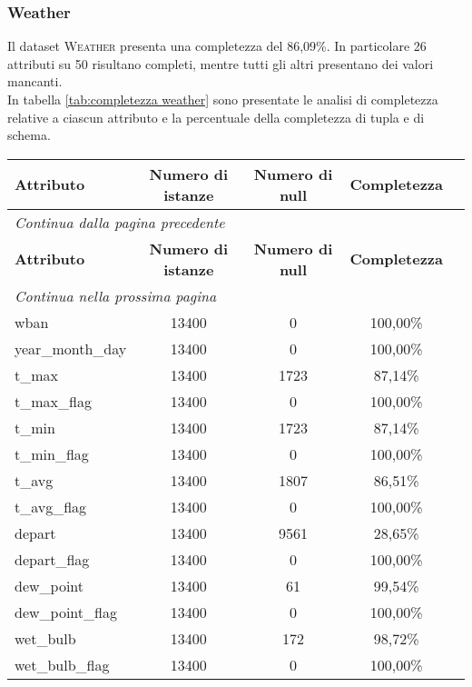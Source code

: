 \subsubsection*{Weather}
Il dataset \textsc{Weather} presenta una completezza del 86,09\%. In particolare 26 attributi su 50 risultano completi, mentre tutti gli altri presentano dei valori mancanti.\\
In tabella \ref{tab:completezza weather} sono presentate le analisi di completezza relative a ciascun attributo e la percentuale della completezza di tupla e di schema.

	\begin{longtable}{lcccc}
		\toprule
		\textbf{Attributo} \quad & \textbf{Numero di istanze} & \textbf{Numero di null} & \textbf{Completezza} \\
		\midrule
		\endfirsthead
		\multicolumn{5}{l}{\footnotesize\itshape Continua dalla pagina precedente} \\
		\toprule
		\textbf{Attributo} \quad & \textbf{Numero di istanze} & \textbf{Numero di null} & \textbf{Completezza} \\
		\midrule			
		\endhead
		\multicolumn{5}{l}{\footnotesize\itshape Continua nella prossima pagina} \\
		\endfoot
		\endlastfoot
		wban				& 13400 & 0		 	 & 100,00\%  	\\	
		year\_month\_day	& 13400 & 0		 	 & 100,00\%  	\\	
		t\_max				& 13400 & 1723	     & 87,14\%  	\\
		t\_max\_flag		& 13400 & 0		     & 100,00\% 	\\	
		t\_min				& 13400 & 1723	     & 87,14\%  	\\
		t\_min\_flag		& 13400 & 0		     & 100,00\% 	\\	
		t\_avg				& 13400 & 1807	     & 86,51\%  	\\
		t\_avg\_flag		& 13400 & 0		     & 100,00\% 	\\	
		depart				& 13400 & 9561	     & 28,65\%  	\\
		depart\_flag		& 13400 & 0		     & 100,00\% 	\\	
		dew\_point			& 13400 & 61	   	 & 99,54\%  	\\
		dew\_point\_flag	& 13400 & 0		     & 100,00\% 	\\		
		wet\_bulb			& 13400 & 172	     & 98,72\%  	\\
		wet\_bulb\_flag		& 13400 & 0		     & 100,00\% 	\\	

\end{longtable}
